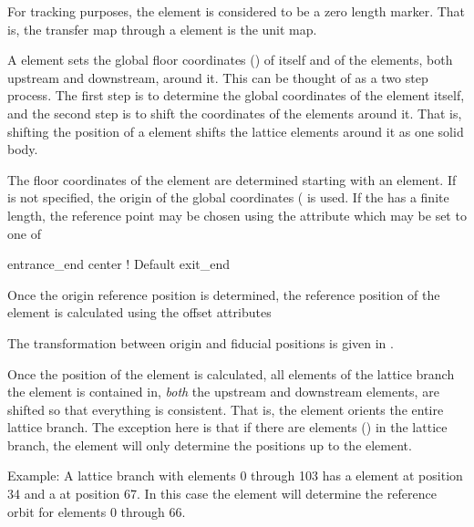 For tracking purposes, the  element is considered to be a
zero length marker. That is, the transfer map through a 
element is the unit map.

A  element sets the global floor coordinates () of itself and of the
elements, both upstream and downstream, around it. This can be thought of as a two step process. The
first step is to determine the global coordinates of the  element itself, and the
second step is to shift the coordinates of the elements around it. That is, shifting the position
of a  element shifts the lattice elements around it as one solid body.

The floor coordinates of the  element are determined starting with an 
element. If  is not specified, the origin of the global coordinates (
is used. If the  has a finite length, the reference point may be chosen using the
 attribute which may be set to one of
\begin{example}
  entrance_end
  center         ! Default
  exit_end
\end{example}

Once the origin reference position is determined, the reference
position of the  element is calculated using the offset
attributes 
\begin{example}
\end{example}
The transformation between origin and fiducial positions is given in
.

Once the position of the  element is calculated, all elements of the lattice branch the
 element is contained in, {\em both} the upstream and downstream elements, are shifted
so that everything is consistent. That is, the  element orients the entire lattice
branch. The exception here is that if there are   elements ()
in the lattice branch, the  element will only determine the positions up to the
  element.

Example: A lattice branch with elements 0 through 103 has a  element at position 34 and
a   at position 67. In this case the  element will determine the
reference orbit for elements 0 through 66.

